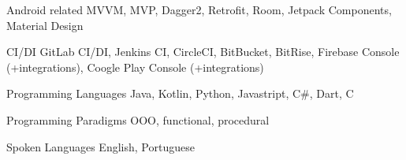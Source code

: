 

\begin{cvskills}

  \cvskill
    {Android related} %
    {MVVM, MVP, Dagger2, Retrofit, Room, Jetpack Components, Material Design} %

  \cvskill
    {CI/DI} %
    {GitLab CI/DI, Jenkins CI, CircleCI, BitBucket, BitRise, Firebase Console (+integrations), Coogle Play Console (+integrations)} %

  \cvskill
    {Programming Languages} %
    {Java, Kotlin, Python, Javastript, C\#, Dart, C} %

  \cvskill
    {Programming Paradigms} %
    {OOO, functional, procedural} %


  \cvskill
    {Spoken Languages} %
    {English, Portuguese} %

\end{cvskills}
